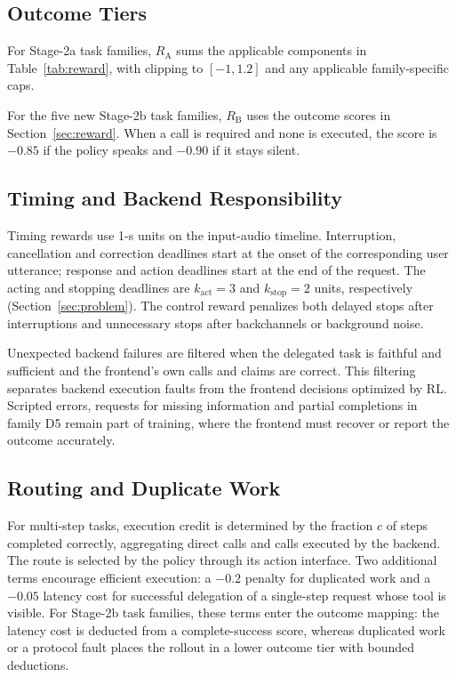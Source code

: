 \subsection{Outcome Tiers}
For Stage-2a task families, $R_{\mathrm A}$ sums the applicable
components in Table~\ref{tab:reward}, with clipping to $[-1,1.2]$
and any applicable family-specific caps.

For the five new Stage-2b task families, $R_{\mathrm B}$ uses the outcome scores in Section~\ref{sec:reward}. When a call is required and none is executed, the score is $-0.85$ if the policy speaks and $-0.90$ if it stays silent.

\subsection{Timing and Backend Responsibility}
Timing rewards use 1-s units on the input-audio timeline.
Interruption, cancellation and correction deadlines start at the onset of the corresponding user utterance; response and action deadlines start at the end of the request.
The acting and stopping deadlines are $k_{\mathrm{act}}=3$ and $k_{\mathrm{stop}}=2$ units, respectively (Section~\ref{sec:problem}).
The control reward penalizes both delayed stops after interruptions and unnecessary stops after backchannels or background noise.

Unexpected backend failures are filtered when the delegated task is faithful and sufficient and the frontend's own calls and claims are correct.
This filtering separates backend execution faults from the frontend decisions optimized by RL.
Scripted errors, requests for missing information and partial completions in family D5 remain part of training, where the frontend must recover or report the outcome accurately.

\subsection{Routing and Duplicate Work}
For multi-step tasks, execution credit is determined by the fraction $c$ of steps completed correctly, aggregating direct calls and calls executed by the backend.
The route is selected by the policy through its action interface.
Two additional terms encourage efficient execution: a $-0.2$ penalty for duplicated work and a $-0.05$ latency cost for successful delegation of a single-step request whose tool is visible.
For Stage-2b task families, these terms enter the outcome mapping: the latency cost is deducted from a complete-success score, whereas duplicated work or a protocol fault places the rollout in a lower outcome tier with bounded deductions.

